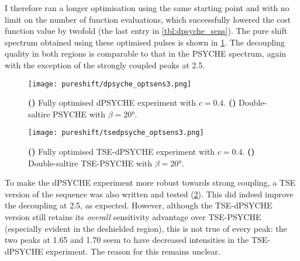 I therefore ran a longer optimisation using the same starting point and with no limit on the number of function evaluations, which successfully lowered the cost function value by twofold (the last entry in \cref{tbl:dpsyche_sens}).
The pure shift spectrum obtained using these optimised pulses is shown in \cref{fig:dpsyche_optsens3}.
The decoupling quality in both regions is comparable to that in the PSYCHE spectrum, again with the exception of the strongly coupled peaks at \SI{2.5}{\ppm}.

\begin{figure}[htb]
    \centering
    \texttt{[image: pureshift/dpsyche\_optsens3.png]}%
    {\label{fig:dpsyche_optsens3_d}}%
    {\label{fig:dpsyche_optsens3_p}}%
    \caption[dPSYCHE final optimisation with $c = 0.4$]{
        \textbf{()} Fully optimised dPSYCHE experiment with $c = 0.4$.
        \textbf{()} Double-saltire PSYCHE with $\beta = \ang{20}$.
    }
    \label{fig:dpsyche_optsens3}
\end{figure}

\begin{figure}[htb]
    \centering
    \texttt{[image: pureshift/tsedpsyche\_optsens3.png]}%
    {\label{fig:tsedpsyche_optsens3_d}}%
    {\label{fig:tsedpsyche_optsens3_p}}%
    \caption[TSE-dPSYCHE final optimisation with $c = 0.4$]{
        \textbf{()} Fully optimised TSE-dPSYCHE experiment with $c = 0.4$.
        \textbf{()} Double-saltire TSE-PSYCHE with $\beta = \ang{20}$.
    }
    \label{fig:tsedpsyche_optsens3}
\end{figure}

To make the dPSYCHE experiment more robust towards strong coupling, a TSE version of the sequence was also written and tested (\cref{fig:tsedpsyche_optsens3}).
This did indeed improve the decoupling at \SI{2.5}{\ppm}, as expected.
However, although the TSE-dPSYCHE version still retains its \textit{overall} sensitivity advantage over TSE-PSYCHE (especially evident in the deshielded region), this is not true of every peak: the two peaks at 1.65 and \SI{1.70}{\ppm} seem to have decreased intensities in the TSE-dPSYCHE experiment.
The reason for this remains unclear.

